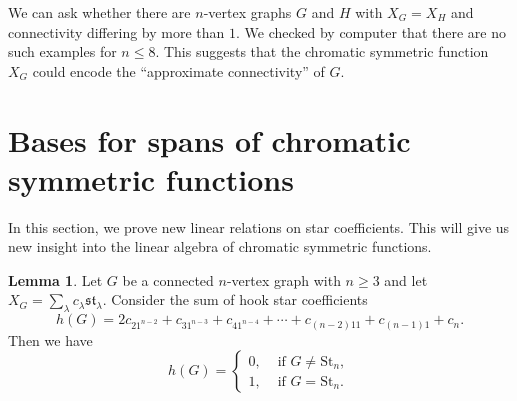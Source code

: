\documentclass[12pt]{amsart}  %
\theoremstyle{definition}
\newtheorem{lemma}[theorem]{Lemma}
\theoremstyle{remark}
\numberwithin{equation}{section}
\begin{document}
We can ask whether there are $n$-vertex graphs $G$ and $H$ with $X_G=X_H$ and connectivity differing by more than $1$. We checked by computer that there are no such examples for $n\leq 8$. This suggests that the chromatic symmetric function $X_G$ could encode the ``approximate connectivity'' of $G$. 

\section{Bases for spans of chromatic symmetric functions}\label{sec:linear}

In this section, we prove new linear relations on star coefficients. This will give us new insight into the linear algebra of chromatic symmetric functions.

\begin{lemma}\label{lem:hookrelation}
Let $G$ be a connected $n$-vertex graph with $n\geq 3$ and let $X_G=\sum_\lambda c_\lambda\mathfrak{st}_\lambda$. Consider the sum of hook star coefficients
\begin{equation}
h(G)=2c_{21^{n-2}}+c_{31^{n-3}}+c_{41^{n-4}}+\cdots+c_{(n-2)11}+c_{(n-1)1}+c_n.
\end{equation}
Then we have
\begin{equation}\label{eq:hookrelation}
h(G)=\begin{cases}0,&\text{ if }G\neq \text{St}_n,\\
1,&\text{ if }G=\text{St}_n.
\end{cases}
\end{equation}
\end{lemma}
\end{document}
